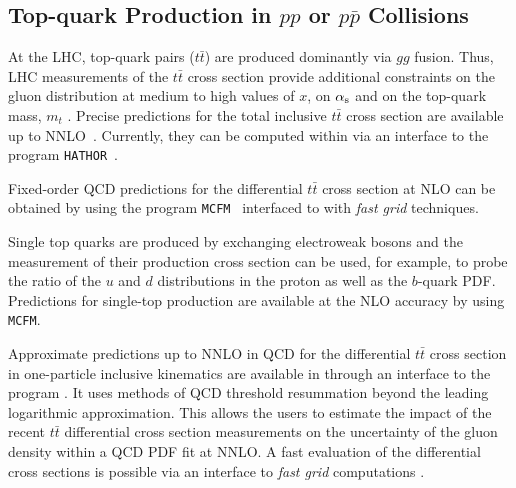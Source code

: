 


\subsection{Top-quark Production in $pp$ or $p \bar p$ Collisions}

At the LHC, top-quark pairs ($t \bar t$) are produced dominantly via $gg$ fusion.
Thus, LHC measurements of the $t \bar t$ cross section provide additional 
constraints on the gluon distribution at medium to high values of $x$, 
on $\alpha_\mathrm{s}$ and on the top-quark mass, $m_t$ \cite{cms:top}. 
Precise predictions for the total inclusive $t \bar t$ cross section are available 
up to NNLO~\cite{Czakon:2013goa,Czakon:2011xx}. Currently, they can be computed within \fitter via an interface 
to the program \texttt{HATHOR}~\cite{Aliev:2010zk}. 

Fixed-order QCD predictions for the differential $t \bar t$ cross section at NLO can be obtained by using
the program \texttt{MCFM}~\cite{Campbell:2010ff,Campbell:2009ss,Campbell:2005bb,Campbell:2004ch,Campbell:2012uf} 
interfaced to \fitter with \emph{fast grid} techniques.

Single top quarks are produced by exchanging electroweak bosons and the measurement of their production cross section can be used, for example, 
to probe the ratio of the $u$ and $d$ distributions in the proton 
as well as the $b$-quark PDF. Predictions 
for single-top production are available at the NLO accuracy by using \texttt{MCFM}.

Approximate predictions up to NNLO in QCD for the differential $t\bar{t}$ cross section in one-particle 
inclusive kinematics are available in \fitter through an interface to the program \difftop \cite{Guzzi:2014wia,difftop-web}.
It uses methods of QCD threshold resummation beyond the leading logarithmic approximation.
This allows the users to estimate the impact of the recent $t\bar{t}$ differential cross section measurements on the uncertainty 
of the gluon density within a QCD PDF fit at NNLO.
A fast evaluation of the \difftop differential cross sections is possible via an interface to \emph{fast grid}
computations \cite{dis2014Fast}. 

